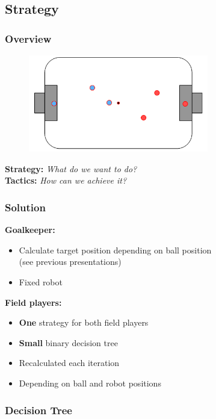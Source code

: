 \documentclass[hyperref={pdfpagelabels=false},compress]{beamer}
\begin{document}
\subsection{Strategy}
\begin{frame}
    \frametitle{Overview}
    \begin{figure}
        \includegraphics[width=0.7\textwidth]{Pictures/strategy}
    \end{figure}
    \textbf{Strategy:} \textit{What do we want to do?}\\
    \textbf{Tactics:} \textit{How can we achieve it?}
\end{frame}

\begin{frame}
    \frametitle{Solution}
    \textbf{Goalkeeper:}\\
    \begin{itemize}
        \item Calculate target position depending on ball position\\
        (see previous presentations)
        \item Fixed robot
    \end{itemize}

    \textbf{Field players:}\\
    \begin{itemize}
        \item \textbf{One} strategy for both field players
        \item \textbf{Small} binary decision tree
        \item Recalculated each iteration
        \item Depending on ball and robot positions
    \end{itemize}

\end{frame}

\begin{frame}
    \frametitle{Decision Tree}
    \begin{center}
        
    \end{center}
\end{frame}
\end{document}
